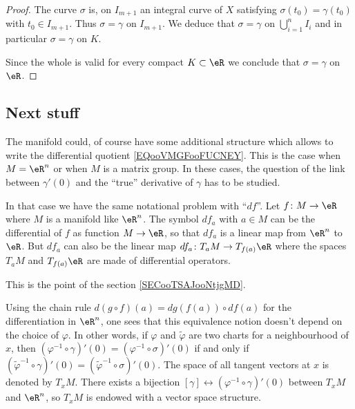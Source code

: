 \begin{proof}
    The curve \( \sigma\) is, on \( I_{m+1}\) an integral curve of \( X\) satisfying \( \sigma(t_0)=\gamma(t_0)\) with \( t_0\in I_{m+1}\). Thus \( \sigma=\gamma\) on \( I_{m+1}\). We deduce that \( \sigma=\gamma\) on \( \bigcup_{i=1}^nI_i\) and in particular \( \sigma=\gamma\) on \( K\).

    Since the whole is valid for every compact \( K\subset \eR\) we conclude that \( \sigma=\gamma\) on \( \eR\).
\end{proof}

\subsection{Next stuff}

    The manifold could, of course have some additional structure which allows to write the differential quotient \eqref{EQooVMGFooFUCNEY}. This is the case when \( M=\eR^n\) or when \( M\) is a matrix group. In these cases, the question of the link between \( \gamma'(0)\) and the ``true'' derivative of \( \gamma\) has to be studied.

    In that case we have the same notational problem with ``$df$''. Let \( f\colon M\to \eR\) where \( M\) is a manifold like \( \eR^n\). The symbol \( df_a\) with \( a\in M\) can be the differential of \( f\) as function \( M\to \eR\), so that \( df_a\) is a linear map from \( \eR^n\) to \( \eR\). But \( df_a\) can also be the linear map \( df_a\colon T_aM\to T_{f(a)}\eR\) where the spaces \( T_aM\) and \( T_{f(a)}\eR\) are made of differential operators.

    This is the point of the section \ref{SECooTSAJooNtjgMD}.

Using the chain rule $d(g\circ f)(a)=dg(f(a))\circ df(a)$ for the differentiation in $\eR^n$, one sees that this equivalence notion doesn't depend on the choice of $\varphi$. In other words, if $\varphi$ and $\tilde{\varphi}$ are two charts for a neighbourhood of $x$, then $(\varphi^{-1} \circ\gamma)'(0)=(\varphi^{-1} \circ\sigma)'(0)$ if and only if $(\tilde{\varphi}^{-1} \circ\gamma)'(0)=(\tilde{\varphi}^{-1} \circ\sigma)'(0)$. The space of all tangent vectors at $x$ is denoted by $T_xM$. There exists a bijection $[\gamma]\leftrightarrow (\varphi^{-1}\circ\gamma)'(0)$ between $T_xM$ and $\eR^n$, so $T_xM$ is endowed with a vector space structure.

